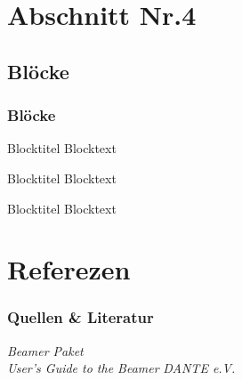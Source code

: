 \documentclass{beamer}
\begin{document}
\section{Abschnitt Nr.4}
\subsection{Bl\"ocke}
\begin{frame}\frametitle{Bl\"ocke}

\begin{block}{Blocktitel}
Blocktext 
\end{block}

\begin{exampleblock}{Blocktitel}
Blocktext 
\end{exampleblock}


\begin{alertblock}{Blocktitel}
Blocktext 
\end{alertblock}
\end{frame}

\section[Quellen]{Referezen}
\begin{frame}\frametitle{Quellen \& Literatur}

\begin{thebibliography}{9}
 \emph{Beamer Paket} \\ 
 \emph{User's Guide to the Beamer} 
 \emph{DANTE e.V.}    
\end{thebibliography}


\end{frame}
\end{document}
